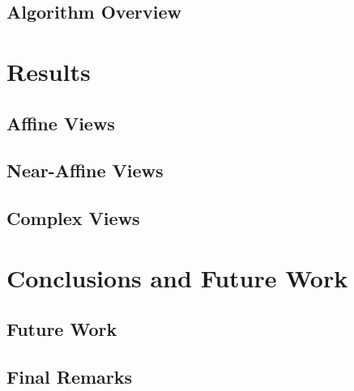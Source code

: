 \documentclass[11pt]{report}
\begin{document}
\begin{doublespace}
\section{Algorithm Overview}

\indent




\chapter{Results}

\indent


\section{Affine Views}

\indent
%


\section{Near-Affine Views}

\indent
%


\section{Complex Views}

\indent
%




\chapter{Conclusions and Future Work}

\indent


\section{Future Work}

\indent


\section{Final Remarks}

\indent



\end{doublespace}
\end{document}
